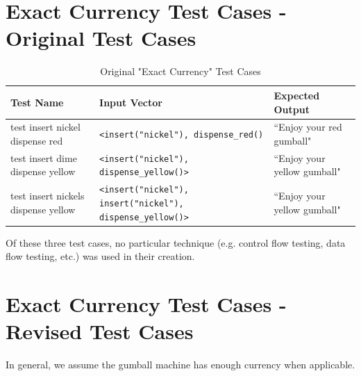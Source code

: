 \documentclass[10pt,letterpaper]{article}
\begin{document}

\newpage
\section{Exact Currency Test Cases - Original Test Cases}
\begin{table}[!htb]
\begin{tabularx}{\textwidth}{XXX}
\toprule
Test Name &
    Input Vector &
    Expected Output \\ \midrule
test insert nickel dispense red &
    \texttt{<insert("nickel"), dispense\_red()} &
    ``Enjoy your red gumball" \\ \midrule
test insert dime dispense yellow &
    \texttt{<insert("nickel"), dispense\_yellow()>} &
    ``Enjoy your yellow gumball" \\ \midrule
test insert nickels dispense yellow &
    \texttt{<insert("nickel"), insert("nickel"), dispense\_yellow()>} &
    ``Enjoy your yellow gumball" \\ \bottomrule
\end{tabularx}
\caption{Original "Exact Currency" Test Cases}
\end{table}

Of these three test cases, no particular technique (e.g. control flow testing, data flow testing, etc.) was used in their creation.

\newpage
\section{Exact Currency Test Cases - Revised Test Cases}
In general, we assume the gumball machine has enough currency when applicable.
\end{document}
